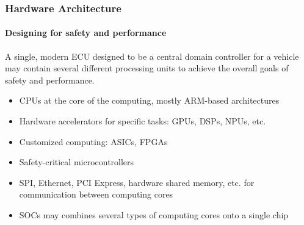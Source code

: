 \begin{frame}
\frametitle{Hardware Architecture}
\framesubtitle{Designing for safety and performance}
A single, modern ECU designed to be a central domain controller for a vehicle
may contain several different processing units to achieve the overall goals
of safety and performance.

\begin{itemize}
    \item CPUs at the core of the computing, mostly ARM-based architectures
    \item Hardware accelerators for specific tasks: GPUs, DSPs, NPUs, etc.
    \item Customized computing: ASICs, FPGAs
    \item Safety-critical microcontrollers
    \item SPI, Ethernet, PCI Express, hardware shared memory, etc. for
        communication between computing cores
    \item SOCs may combines several types of computing cores onto a single chip
\end{itemize}
\end{frame}

